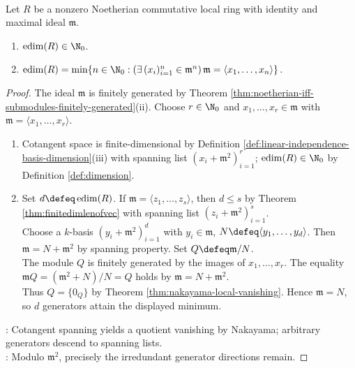 \begin{proposition} \label{prop:embedding-dimension-minimal-generators}
\\
Let $R$ be a nonzero Noetherian commutative local ring with identity and maximal ideal $\mathfrak{m}$.
\begin{enumerate}[label=(\roman*)]
\setlength{\itemsep}{0pt}
\item $\operatorname{edim}(R)\in\N_0$.
\item $\operatorname{edim}(R)=\min\limits\{n\in\N_0:(\exists\,(x_i)_{i=1}^n\in\mathfrak{m}^n)\,\mathfrak{m}=\langle x_1,\ldots,x_n\rangle\}$.
\end{enumerate}
\begin{proof}
The ideal $\mathfrak{m}$ is finitely generated by Theorem \ref{thm:noetherian-iff-submodules-finitely-generated}(ii). Choose $r\in\N_0$ and $x_1,\ldots,x_r\in\mathfrak{m}$ with $\mathfrak{m}=\langle x_1,\ldots,x_r\rangle$.
\begin{enumerate}[label=(\roman*)]
\setlength{\itemsep}{0pt}
\item Cotangent space is finite-dimensional by Definition \ref{def:linear-independence-basis-dimension}(iii) with spanning list $(x_i+\mathfrak{m}^2)_{i=1}^r$; $\operatorname{edim}(R)\in\N_0$ by Definition \ref{def:dimension}.
\item Set $d\defeq\operatorname{edim}(R)$. If $\mathfrak{m}=\langle z_1,\ldots,z_s\rangle$, then $d\leq s$ by Theorem \ref{thm:finitedimlenofvec} with spanning list $(z_i+\mathfrak{m}^2)_{i=1}^s$.\\
Choose a $k$-basis $(y_i+\mathfrak{m}^2)_{i=1}^d$ with $y_i\in\mathfrak{m}$, $N\defeq\langle y_1,\ldots,y_d\rangle$. Then $\mathfrak{m}=N+\mathfrak{m}^2$ by spanning property. Set $Q\defeq\mathfrak{m}/N$.\\
The module $Q$ is finitely generated by the images of $x_1,\ldots,x_r$. The equality $\mathfrak{m}Q=(\mathfrak{m}^2+N)/N=Q$ holds by $\mathfrak{m}=N+\mathfrak{m}^2$.\\
Thus $Q=\{0_Q\}$ by Theorem \ref{thm:nakayama-local-vanishing}. Hence $\mathfrak{m}=N$, so $d$ generators attain the displayed minimum.
\end{enumerate}
: Cotangent spanning yields a quotient vanishing by Nakayama; arbitrary generators descend to spanning lists.\\
: Modulo $\mathfrak{m}^2$, precisely the irredundant generator directions remain.
\end{proof}
\end{proposition}

